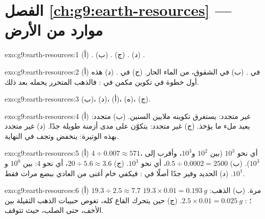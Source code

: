 \section*{الفصل \ref{ch:g9:earth-resources} --- موارد من الأرض}

\begin{solution}{exo:g9:earth-resources:1}
(أ) . (ب) . (ج) . (د) .
\end{solution}

\begin{solution}{exo:g9:earth-resources:2}
(أ) في  . (ب) في الشقوق، من الماء الحار. (ج) في .
(د) هذه أول خطوة في تكوين مكمن في  : فالذهب المتحرر يحمله
 بعد ذلك.
\end{solution}

\begin{solution}{exo:g9:earth-resources:3}
(ب)، (د)، (أ)، (ه)، (ج).
\end{solution}

\begin{solution}{exo:g9:earth-resources:4}
(أ) غير متجدد: يستغرق تكوينه ملايين السنين. (ب) متجدد:  يعيد
ملء ما يؤخذ. (ج) غير متجدد:  يتكوّن على مدى أزمنة طويلة
جدًا. (د) غير متجدد بهذه الوتيرة:  ينخفض وتجف
 في النهاية.
\end{solution}

\begin{solution}{exo:g9:earth-resources:5}
(أ) $4 \div 0.007 \approx 571$، أي نحو $10^3$ (بين $10^2$ و$10^3$،
وأقرب إلى $10^3$). (ب) $0.5 \div 0.0002 = 2500$، أي نحو $10^3$. (ج) $20
\div 5.6 \approx 3.6$، أي نحو 4: بين $10^0$ و$10^1$.
(د) الحديد وفير جدًا أصلًا في : فيكفي خام أغنى من  العادي
ببضع مرات فقط.
\end{solution}

\begin{solution}{exo:g9:earth-resources:6}
(أ) $19.3 \div 2.5 \approx 7.7$ مرة. (ب) الذهب: $19.3 \times 0.01 =
\qty{0.193}{g}$؛ : $2.5 \times 0.01 = \qty{0.025}{g}$. (ج) حين
يتحرك القاع كله، تغوص حبيبات الذهب الثقيلة بين   الأخف، حتى
 الصلب، حيث تتوقف.
\end{solution}

